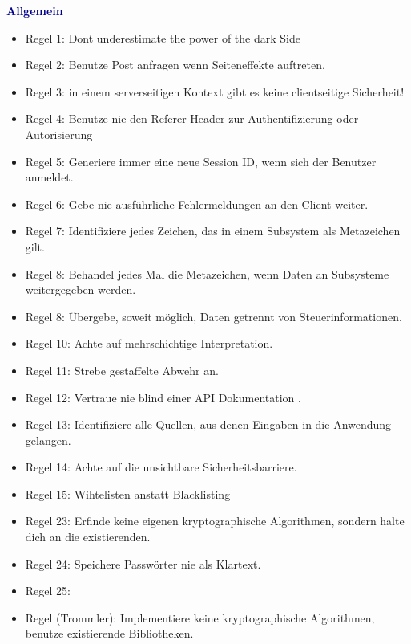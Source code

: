 	\textbf{\textcolor{darkblue}{ Allgemein}}~
	\begin{itemize}
	
\item	Regel 1: Dont underestimate the power of the dark Side
\item	Regel 2: Benutze Post anfragen wenn Seiteneffekte auftreten.
\item	Regel 3: in einem serverseitigen Kontext gibt es keine clientseitige Sicherheit!
\item	Regel 4: Benutze nie den Referer Header zur Authentifizierung oder Autorisierung
\item	Regel 5: Generiere immer eine neue Session ID, wenn sich der Benutzer anmeldet.
\item	Regel 6: Gebe nie ausführliche Fehlermeldungen an den Client weiter.
\item	Regel 7: Identifiziere jedes Zeichen, das in einem Subsystem als Metazeichen gilt.
\item	Regel 8: Behandel jedes Mal die Metazeichen, wenn Daten an Subsysteme weitergegeben werden.
\item	Regel 8: Übergebe, soweit möglich, Daten getrennt von Steuerinformationen.
\item	Regel 10: Achte auf mehrschichtige Interpretation.
\item	Regel 11: Strebe gestaffelte Abwehr an.
\item	Regel 12: Vertraue nie blind einer API Dokumentation .
\item	Regel 13: Identifiziere alle Quellen, aus denen Eingaben in die Anwendung gelangen.
\item	Regel 14: Achte auf die unsichtbare Sicherheitsbarriere.
\item	Regel 15: Wihtelisten anstatt Blacklisting
\item	Regel 23: Erfinde keine eigenen kryptographische Algorithmen, sondern halte dich an die existierenden.
\item	Regel 24: Speichere Passwörter nie als Klartext.
\item	Regel 25: 	
\item   Regel (Trommler): Implementiere keine kryptographische Algorithmen, benutze existierende Bibliotheken.
	\end{itemize}

